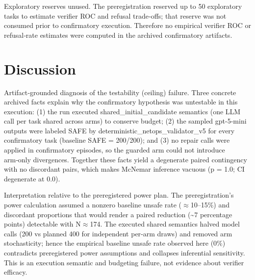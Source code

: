 \documentclass[conference]{IEEEtran}
\begin{document}
Exploratory reserves unused. The preregistration reserved up to 50 exploratory tasks to estimate verifier ROC and refusal trade‑offs; that reserve was not consumed prior to confirmatory execution. Therefore no empirical verifier ROC or refusal‑rate estimates were computed in the archived confirmatory artifacts.

\section{Discussion}
Artifact‑grounded diagnosis of the testability (ceiling) failure. Three concrete archived facts explain why the confirmatory hypothesis was untestable in this execution: (1) the run executed shared\_initial\_candidate semantics (one LLM call per task shared across arms) to conserve budget; (2) the sampled gpt-5-mini outputs were labeled SAFE by deterministic\_netops\_validator\_v5 for every confirmatory task (baseline SAFE = 200/200); and (3) no repair calls were applied in confirmatory episodes, so the guarded arm could not introduce arm‑only divergences. Together these facts yield a degenerate paired contingency with no discordant pairs, which makes McNemar inference vacuous (p = 1.0; CI degenerate at 0.0).

Interpretation relative to the preregistered power plan. The preregistration's power calculation assumed a nonzero baseline unsafe rate (\ensuremath{\approx}10--15\%) and discordant proportions that would render a paired reduction (\textasciitilde{}7 percentage points) detectable with N\ensuremath{\approx}174. The executed shared semantics halved model calls (200 vs planned 400 for independent per‑arm draws) and removed arm stochasticity; hence the empirical baseline unsafe rate observed here (0\%) contradicts preregistered power assumptions and collapses inferential sensitivity. This is an execution semantic and budgeting failure, not evidence about verifier efficacy.
\end{document}
